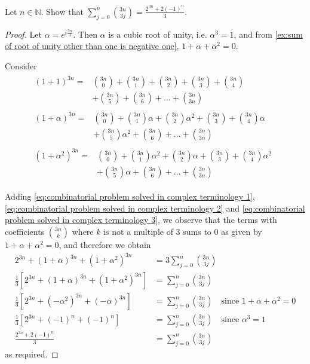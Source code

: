 \documentclass[notoc,notitlepage]{tufte-book}
\begin{document}
\begin{ex}
	Let $n \in \mathbb{N}$. Show that $\sum_{j=0}^{n} \binom{3n}{3j} = \frac{2^{3n} + 2(-1)^n}{3}$.

	\begin{proof}
		Let $\alpha = e^{i \frac{2\pi}{3}}$. Then $\alpha$ is a cubic root of unity, i.e. $\alpha^3 = 1$, and from \cref{ex:sum of root of unity other than one is negative one}, $1 + \alpha + \alpha^2 = 0$.

		Consider
		\begin{align}
			\begin{split}\label{eq:combinatorial problem solved in complex terminology 1}
			(1 + 1)^{3n}
				=& \binom{3n}{0} + \binom{3n}{1} + \binom{3n}{2} + \binom{3n}{3} + \binom{3n}{4} \\
				&+ \binom{3n}{5} + \binom{3n}{6} + \hdots + \binom{3n}{3n}
			\end{split} \\
			\begin{split}\label{eq:combinatorial problem solved in complex terminology 2}
			(1 + \alpha)^{3n}
				=& \binom{3n}{0} + \binom{3n}{1}\alpha + \binom{3n}{2}\alpha^2 + \binom{3n}{3} + \binom{3n}{4}\alpha \\
				&+ \binom{3n}{5}\alpha^2 + \binom{3n}{6} + \hdots + \binom{3n}{3n}
			\end{split} \\
			\begin{split}\label{eq:combinatorial problem solved in complex terminology 3}
			(1 + \alpha^2)^{3n}
				=&\binom{3n}{0} + \binom{3n}{1}\alpha^2 + \binom{3n}{2}\alpha + \binom{3n}{3} + \binom{3n}{4}\alpha^2 \\
				&+ \binom{3n}{5}\alpha + \binom{3n}{6} + \hdots + \binom{3n}{3n}
			\end{split}
			\phantom{a}
		\end{align}

		Adding \cref{eq:combinatorial problem solved in complex terminology 1}, \cref{eq:combinatorial problem solved in complex terminology 2} and \cref{eq:combinatorial problem solved in complex terminology 3}, we observe that the terms with coefficients $\binom{3n}{k}$ where $k$ is not a multiple of 3 sums to 0 as given by $1 + \alpha + \alpha^2 = 0$, and therefore we obtain
		\begin{align*}
			2^{3n} + (1 + \alpha)^{3n} + (1 + \alpha^2)^{3n} &= 3 \sum_{j=0}^{n} \binom{3n}{3j} \\
			\frac{1}{3} \left[2^{3n} + (1 + \alpha)^{3n} + (1 + \alpha^2)^{3n}\right] &= \sum_{j=0}^{n} \binom{3n}{3j} \\
			\frac{1}{3} \left[2^{3n} + (-\alpha^2)^{3n} + (-\alpha)^{3n} \right] &= \sum_{j=0}^{n} \binom{3n}{3j} \quad \text{since } 1 + \alpha + \alpha^2 = 0 \\
			\frac{1}{3} \left[2^{3n} + (-1)^n + (-1)^n \right] &= \sum_{j=0}^{n} \binom{3n}{3j} \quad \text{since } \alpha^3 = 1 \\
			\frac{2^{3n} + 2(-1)^n}{3} &= \sum_{j=0}^{n} \binom{3n}{3j}
		\end{align*}
		as required.
	\end{proof}
\end{ex}
\end{document}
